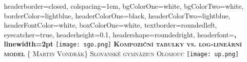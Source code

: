 \documentclass[landscape,a0paper,fontscale=0.285]{baposter} %
\begin{document}
\begin{poster}
{
headerborder=closed, %
colspacing=1em, %
bgColorOne=white, %
bgColorTwo=white, %
borderColor=lightblue, %
headerColorOne=black, %
headerColorTwo=lightblue, %
headerFontColor=white, %
boxColorOne=white, %
textborder=roundedleft, %
eyecatcher=true, %
headerheight=0.1\textheight, %
headershape=roundedright, %
headerfont=\Large\bf\textsc, %
linewidth=2pt %
}
%
{\texttt{[image: sgo.png]}} %
{\bf\textsc{Kompoziční tabulky vs. log-lineární model}\vspace{0.5em}} %
{\textsc{\{ Martin Vondrák\} \hspace{12pt} Slovanské gymnáziun Olomouc}} %
{\texttt{[image: up.png]}} %


\end{poster}
\end{document}
